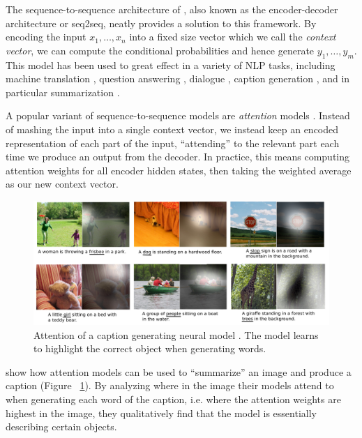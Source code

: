 \documentclass[12pt]{report}
\begin{document}
The sequence-to-sequence architecture of \citet{sutskever2014sequence}, also known as the encoder-decoder architecture or seq2seq, neatly provides a solution to this framework. By encoding the input $x_1, \ldots, x_n$ into a fixed size vector which we call the \emph{context vector}, we can compute the conditional probabilities and hence generate $y_1, \ldots, y_m$.
This model has been used to great effect in a variety of NLP tasks, including machine translation \citep{sutskever2014sequence, bahdanau2014neural}, question answering \citep{Hermann2015}, dialogue \citep{li2016persona}, caption generation \citep{xu2015captioning}, and in particular summarization \citep{rush2015neural}.


A popular variant of sequence-to-sequence models are \emph{attention} models \citep{bahdanau2014neural}. Instead of mashing the input into a single context vector, we instead keep an encoded representation of each part of the input, ``attending'' to the relevant part each time we produce an output from the decoder. In practice, this means computing attention weights for all encoder hidden states, then taking the weighted average as our new context vector.

\begin{figure}[t]
\centering
\includegraphics[width=\textwidth]{images/xucaption}
\caption[Attention for Image Captioning]{Attention of a caption generating neural model \citep{xu2015captioning}. The model learns to highlight the correct object when generating words.}
\label{fig:caption}
\end{figure}

\citet{xu2015captioning} show how attention models can be used to ``summarize'' an image and produce a caption (Figure ~\ref{fig:caption}). 
By analyzing where in the image their models attend to when generating each word of the caption, i.e. where the attention weights are highest in the image, they qualitatively find that the model is essentially describing certain objects.
\end{document}
